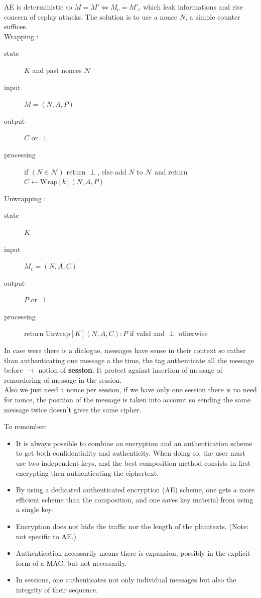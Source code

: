 \documentclass[11pt,a4paper]{report}
\begin{document}
AE is deterministic so $M = M' \Leftrightarrow M_c = M'_c$ which leak informations and rise concern of replay attacks. The solution is to use a nonce $N$, a simple counter suffices.\\
Wrapping : \begin{description}
\item[state] $K$ and past nonces $\mathcal{N}$
\item[input] $M = (N,A,P)$
\item[output] $C$ or $\perp$
\item[processing] if $(N \in \mathcal{N})$ return $\perp$, else add $N$ to $\mathcal{N}$ and return $C \leftarrow \text{Wrap}[k](N,A,P)$
\end{description}
Unwrapping :
\begin{description}
\item[state] $K$
\item[input] $M_c = (N,A,C)$
\item[output] $P$ or $\perp$
\item[processing] return $\text{Unwrap}[K](N,A,C):P$ if valid and $\perp$ otherwise
\end{description}

In case were there is a dialogue, messages have sense in their context so rather than authenticating one message a the time, the tag authenticate all the message before $\rightarrow$ notion of \textbf{session}. It protect against insertion of message of remordering of message in the session.\\
Also we just need a nonce per session, if we have only one session there is no need for nonce, the position of the message is taken into account so sending the same message twice doesn't gives the same cipher.

To remember:
\begin{itemize}
\item It is always possible to combine an encryption and an authentication scheme to get both confidentiality and authenticity. When doing so, the user must use two independent keys, and the best composition method consists in first encrypting then authenticating the ciphertext.
\item By using a dedicated authenticated encryption (AE) scheme, one gets a more efficient scheme than the composition, and one saves key material from using a single key.
\item Encryption does not hide the traffic nor the length of the plaintexts. (Note: not specific to AE.)
\item Authentication necessarily means there is expansion, possibly in the explicit form of a MAC, but not necessarily.
\item In sessions, one authenticates not only individual messages but also the integrity of their sequence.
\end{itemize}
\end{document}
